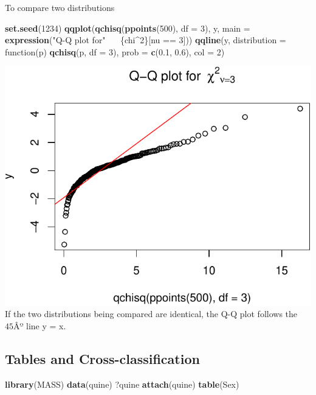 \documentclass[]{article}
\newenvironment{Shaded}{\begin{snugshade}}{\end{snugshade}}
\newcommand{\KeywordTok}[1]{\textcolor[rgb]{0.13,0.29,0.53}{\textbf{{#1}}}}
\newcommand{\DataTypeTok}[1]{\textcolor[rgb]{0.13,0.29,0.53}{{#1}}}
\newcommand{\DecValTok}[1]{\textcolor[rgb]{0.00,0.00,0.81}{{#1}}}
\newcommand{\FloatTok}[1]{\textcolor[rgb]{0.00,0.00,0.81}{{#1}}}
\newcommand{\StringTok}[1]{\textcolor[rgb]{0.31,0.60,0.02}{{#1}}}
\newcommand{\ErrorTok}[1]{\textcolor[rgb]{0.64,0.00,0.00}{\textbf{{#1}}}}
\newcommand{\NormalTok}[1]{{#1}}
\numberwithin{equation}{section}
\begin{document}
To compare two distributions

\begin{Shaded}
\begin{Highlighting}[]
\KeywordTok{set.seed}\NormalTok{(}\DecValTok{1234}\NormalTok{)}
\KeywordTok{qqplot}\NormalTok{(}\KeywordTok{qchisq}\NormalTok{(}\KeywordTok{ppoints}\NormalTok{(}\DecValTok{500}\NormalTok{), }\DataTypeTok{df =} \DecValTok{3}\NormalTok{), y,}
       \DataTypeTok{main =} \KeywordTok{expression}\NormalTok{(}\StringTok{"Q-Q plot for"} \NormalTok{~}\ErrorTok{~}\StringTok{ }\NormalTok{\{chi^}\DecValTok{2}\NormalTok{\}[nu ==}\StringTok{ }\DecValTok{3}\NormalTok{]))}
\KeywordTok{qqline}\NormalTok{(y, }\DataTypeTok{distribution =} \NormalTok{function(p) }\KeywordTok{qchisq}\NormalTok{(p, }\DataTypeTok{df =} \DecValTok{3}\NormalTok{),}
       \DataTypeTok{prob =} \KeywordTok{c}\NormalTok{(}\FloatTok{0.1}\NormalTok{, }\FloatTok{0.6}\NormalTok{), }\DataTypeTok{col =} \DecValTok{2}\NormalTok{)}
\end{Highlighting}
\end{Shaded}

\includegraphics{index_files/figure-latex/unnamed-chunk-88-1.pdf} If the
two distributions being compared are identical, the Q-Q plot follows the
\(45Âº\) line y = x.

\subsection{Tables and
Cross-classification}\label{tables-and-cross-classification}

\begin{Shaded}
\begin{Highlighting}[]
\KeywordTok{library}\NormalTok{(MASS)}
\KeywordTok{data}\NormalTok{(quine)}
\NormalTok{?quine}
\KeywordTok{attach}\NormalTok{(quine)}
\KeywordTok{table}\NormalTok{(Sex)}
\end{Highlighting}
\end{Shaded}
\end{document}
